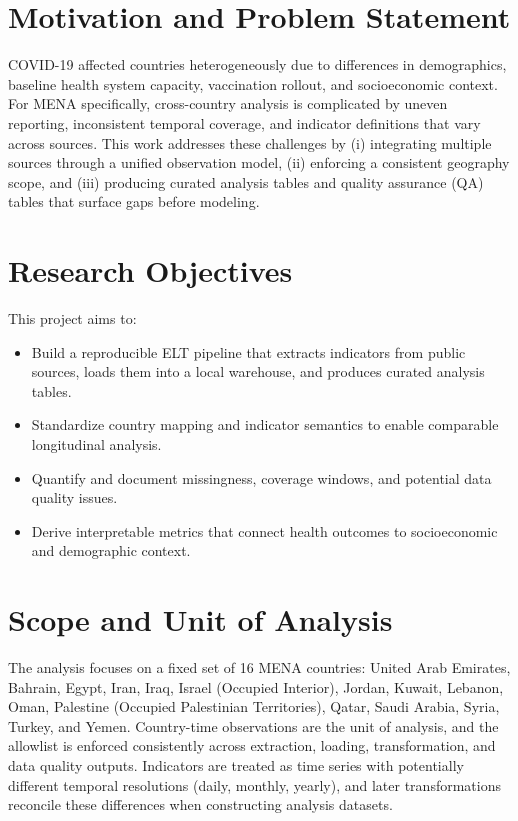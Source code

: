 \documentclass[a4paper]{report}
\begin{document}
\section{Motivation and Problem Statement}
COVID-19 affected countries heterogeneously due to differences in demographics, baseline health system capacity, vaccination rollout, and socioeconomic context.
For MENA specifically, cross-country analysis is complicated by uneven reporting, inconsistent temporal coverage, and indicator definitions that vary across sources.
This work addresses these challenges by (i) integrating multiple sources through a unified observation model, (ii) enforcing a consistent geography scope, and (iii) producing curated analysis tables and quality assurance (QA) tables that surface gaps before modeling.

\section{Research Objectives}
This project aims to:
\begin{itemize}
    \item Build a reproducible ELT pipeline that extracts indicators from public sources, loads them into a local warehouse, and produces curated analysis tables.
    \item Standardize country mapping and indicator semantics to enable comparable longitudinal analysis.
    \item Quantify and document missingness, coverage windows, and potential data quality issues.
    \item Derive interpretable metrics that connect health outcomes to socioeconomic and demographic context.
\end{itemize}

\section{Scope and Unit of Analysis}
The analysis focuses on a fixed set of 16 MENA countries: United Arab Emirates, Bahrain, Egypt, Iran, Iraq, Israel (Occupied Interior), Jordan, Kuwait, Lebanon, Oman, Palestine (Occupied Palestinian Territories), Qatar, Saudi Arabia, Syria, Turkey, and Yemen.
Country-time observations are the unit of analysis, and the allowlist is enforced consistently across extraction, loading, transformation, and data quality outputs.
Indicators are treated as time series with potentially different temporal resolutions (daily, monthly, yearly), and later transformations reconcile these differences when constructing analysis datasets.
 
\end{document}
